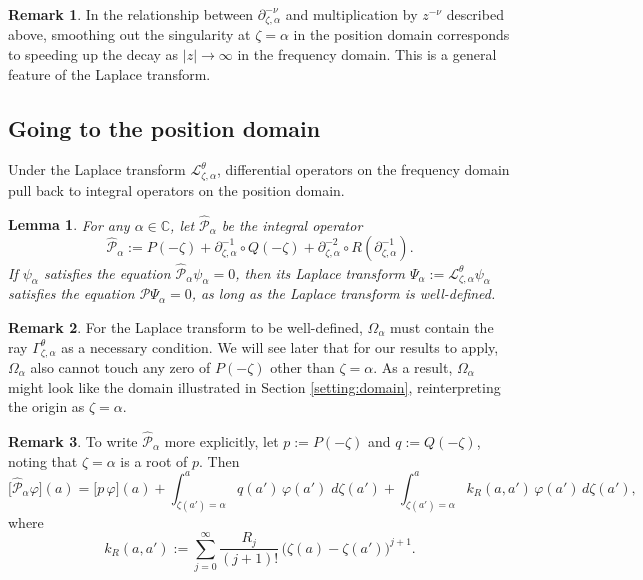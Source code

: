 \documentclass{article}
\theoremstyle{definition}
\newtheorem{rmk}{Remark}
\theoremstyle{plain}
\newtheorem{lemma}{Lemma}
\newcommand{\C}{\mathbb{C}}
\newcommand{\laplace}{\mathcal{L}}
\newcommand{\fracderiv}[3]{\partial^{#1}_{#2, #3}}
\newcommand{\domain}{\Omega}
\newenvironment{revtwo}{\color{revred}}{\color{black}}
\newenvironment{revtwo}{}{}
\begin{document}
\begin{rmk}
In the relationship between $\fracderiv{-\nu}{\zeta}{\alpha}$ and multiplication by $z^{-\nu}$ described above, smoothing out the singularity at $\zeta = \alpha$ in the position domain corresponds to speeding up the decay as $|z| \to \infty$ in the frequency domain. This is a general feature of the Laplace transform.
\end{rmk}
\subsection{Going to the position domain}
Under the Laplace transform $\laplace_{\zeta,\alpha}^{\theta}$, differential operators on the frequency domain pull back to integral operators on the position domain.
\begin{lemma}\label{lem:use-dict}
For any $\alpha \in \C$, let $\hat{\mathcal{P}}_{\alpha}$ be the integral operator 
\[ \hat{\mathcal{P}}_\alpha:=P(-\zeta)+\partial_{\zeta,\alpha}^{-1}\circ Q(-\zeta)+\partial_{\zeta,\alpha}^{-2}\circ R(\partial_{\zeta,\alpha}^{-1}). \]
If $\psi_\alpha$ satisfies the equation $\hat{\mathcal{P}}_\alpha\psi_\alpha=0$, then its Laplace transform $\Psi_\alpha:=\laplace_{\zeta,\alpha}^{\theta}\psi_\alpha$ satisfies the equation $\mathcal{P}\Psi_\alpha=0$, as long as the Laplace transform is well-defined.
\end{lemma}
\begin{rmk}
For the Laplace transform to be well-defined, $\domain_\alpha$ must contain the ray $\Gamma_{\zeta, \alpha}^\theta$ as a necessary condition. We will see later that for our results to apply, $\domain_\alpha$ also cannot touch any zero of $P(-\zeta)$ other than $\zeta = \alpha$. As a result, $\domain_\alpha$ might look like the domain illustrated in Section \ref{setting:domain}, reinterpreting the origin as $\zeta = \alpha$. 
\end{rmk}
\begin{rmk}\label{rmk:use-dict-explicit}
To write $\hat{\mathcal{P}}_\alpha$ more explicitly, let $p := P(-\zeta)$ and $q := Q(-\zeta)$, noting that $\zeta = \alpha$ is a root of $p$. Then
\begin{revtwo}
\[ \big[\hat{\mathcal{P}}_\alpha\varphi\big](a) = \big[ p\, \varphi \big](a) + \int_{\zeta(a')=\alpha}^a q(a') \, \varphi(a') \; d\zeta(a') + \int_{\zeta(a')=\alpha}^a k_R(a, a') \, \varphi(a') \, d\zeta(a'), \]
\end{revtwo}
where
\[ k_R(a,a') := \sum_{j=0}^\infty \frac{R_{j}}{(j+1)!} \, \big(\zeta(a)-\zeta(a')\big)^{j+1} . \]
\end{rmk}
\end{document}
